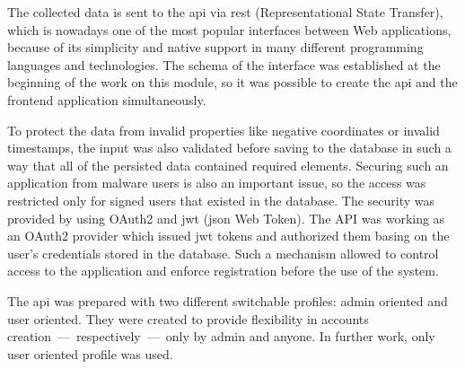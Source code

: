 The collected data is sent to the \gls{api} via \gls{rest} (Representational State Transfer), which is nowadays one of the most popular interfaces between Web applications, because of its simplicity and native support in many different programming languages and technologies.
The schema of the interface was established at the beginning of the work on this module, so it was possible to create the \gls{api} and the frontend application simultaneously.

To protect the data from invalid properties like negative coordinates or invalid timestamps, the input was also validated before saving to the database in such a way that all of the persisted data contained required elements.
Securing such an application from malware users is also an important issue, so the access was restricted only for signed users that existed in the database.
The security was provided by using OAuth2 and \gls{jwt} (\gls{json} Web Token).
The API was working as an OAuth2 provider which issued \gls{jwt} tokens and authorized them basing on the user's credentials stored in the database.
Such a mechanism allowed to control access to the application and enforce registration before the use of the system.

The \gls{api} was prepared with two different switchable profiles: admin oriented and user oriented.
They were created to provide flexibility in accounts creation~---~respectively~---~only by admin and anyone.
In further work, only user oriented profile was used.